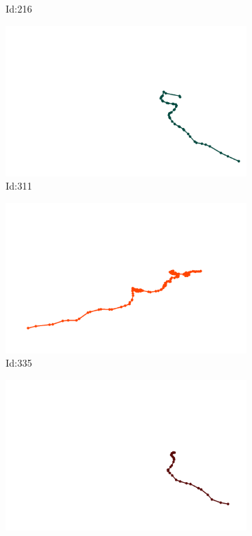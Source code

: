 \documentclass[12pt,twoside]{report}
\begin{document}
\begin{figure}
\begin{subfigure}[b]{0.20\textwidth}
\caption{Id:216}
\end{subfigure}
\begin{subfigure}[b]{0.20\textwidth}
\centering
\includegraphics[width=\textwidth]{../trajectories/311.png}
\caption{Id:311}
\end{subfigure}
\begin{subfigure}[b]{0.20\textwidth}
\centering
\includegraphics[width=\textwidth]{../trajectories/335.png}
\caption{Id:335}
\end{subfigure}
\begin{subfigure}[b]{0.20\textwidth}
\centering
\includegraphics[width=\textwidth]{../trajectories/341.png}

\end{subfigure}
\end{figure}
\end{document}
